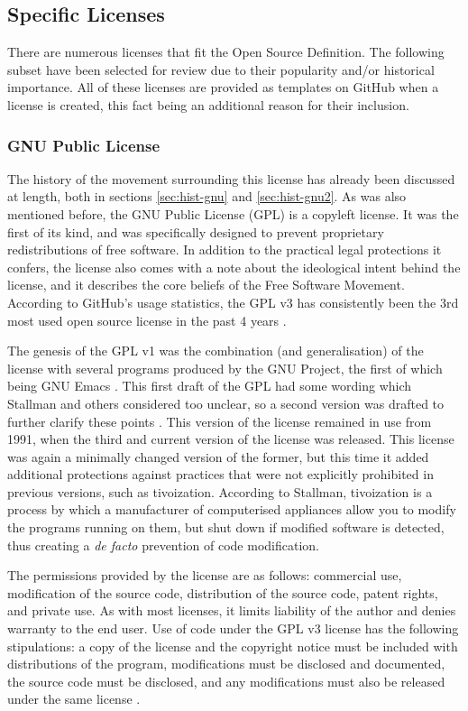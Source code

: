 \documentclass[manuscript,screen,nonacm,12pt]{acmart}
\begin{document}
\subsection{Specific Licenses}
There are numerous licenses that fit the Open Source Definition. The following
subset have been selected for review due to their popularity and/or historical
importance. All of these licenses are provided as templates on GitHub when a
license is created, this fact being an additional reason for their inclusion.

\subsubsection{GNU Public License}
The history of the movement surrounding this license has already been discussed
at length, both in sections \ref{sec:hist-gnu} and \ref{sec:hist-gnu2}. As was
also mentioned before, the GNU Public License (GPL) is a copyleft license. It
was the first of its kind, and was specifically designed to prevent proprietary
redistributions of free software. In addition to the practical legal protections
it confers, the license also comes with a note about the ideological intent
behind the license, and it describes the core beliefs of the Free Software
Movement. According to GitHub's usage statistics, the GPL v3 has consistently
been the 3rd most used open source license in the past 4 years
\cite{githubUsage}.

The genesis of the GPL v1 was the combination (and generalisation) of the
license with several programs produced by the GNU Project, the first of which
being GNU Emacs \cite{history}. This first draft of the GPL had some wording
which Stallman and others considered too unclear, so a second version was drafted
to further clarify these points \cite{history}. This version of the license
remained in use from 1991, when the third and current version of
the license was released. This license was again a minimally changed version of
the former, but this time it added additional protections against practices that
were not explicitly prohibited in previous versions, such as tivoization.
According to Stallman, tivoization is a process by which a manufacturer of
computerised appliances allow you to modify the programs running on them, but
shut down if modified software is detected, thus creating a \textit{de facto}
prevention of code modification.

The permissions provided by the license are as follows: commercial use,
modification of the source code, distribution of the source code, patent rights,
and private use. As with most licenses, it limits liability of the author and
denies warranty to the end user. Use of code under the GPL v3 license has the
following stipulations: a copy of the license and the copyright notice must be
included with distributions of the program, modifications must be disclosed and
documented, the source code must be disclosed, and any modifications must also
be released under the same license \cite{GPLv3}.
\end{document}
